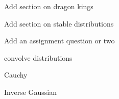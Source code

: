 \begin{frame}

Add section on dragon kings

Add section on stable distributions

Add an assignment question or two

convolve distributions

Cauchy

Inverse Gaussian

\end{frame}

